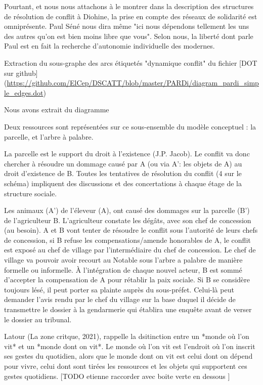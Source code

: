 Pourtant, et nous nous  attachons à le montrer dans la description des structures de résolution de conflit à Diohine, la prise en compte des réseaux de solidarité est omniprésente. Paul Séné nous dira même "ici nous dépendons tellement les uns des autres qu'on est bien moins libre que vous". Selon nous, la liberté dont parle Paul est en fait la recherche d'autonomie individuelle des modernes.

Extraction du sous-graphe des arcs étiquetés  "dynamique conflit" du fichier [DOT sur github](\url{https://github.com/ElCep/DSCATT/blob/master/PARDi/diagram_pardi_simple_edges.dot})

Nous avons extrait du diagramme 


Deux ressources sont représentées sur ce sous-ensemble du modèle conceptuel : la parcelle, et l'arbre à palabre. 

La parcelle est le support du droit à l'existence (J.P. Jacob). Le conflit va donc chercher à résoudre un dommage causé par A (ou via A': les objets de A) au droit d'existence de B. Toutes les tentatives de résolution du conflit (4 sur le schéma) impliquent des discussions et des concertations à chaque étage de la structure sociale.

Les animaux (A') de l'éleveur (A), ont causé des dommages sur la parcelle (B') de l'agriculteur B. L'agriculteur constate les dégâts, avec son chef de concession (au besoin). A et B vont tenter de résoudre le conflit sous l'autorité de leurs chefs de concession, si B refuse les compensations/amende honorables de A, le conflit est exposé au chef de village par l'intermédiaire du chef de concession. Le chef de village va pouvoir avoir recourt au Notable sous l'arbre a palabre de manière formelle ou informelle. À l'intégration de chaque nouvel acteur, B est sommé d'accepter la compensation de A pour rétablir la paix sociale. Si B se considère toujours lésé, il peut porter sa plainte auprès du sous-préfet. Celui-là peut demander l'avis rendu par le chef du village sur la base duquel il décide de transmettre le dossier à la gendarmerie qui établira une enquête avant de verser le dossier au tribunal. 

Latour (La zone critque, 2021), rappelle la dsitinction entre  un *monde où l'on vit* et un *monde dont on vit*. Le monde où l'on vit  est l'endroit où l'on inscrit ses gestes du quotidien, alors que le monde dont on vit est  celui dont on dépend pour vivre, celui dont sont tirées les ressources et les objets qui supportent ces gestes quotidiens. [TODO etienne raccorder avec boite verte en dessous ]

